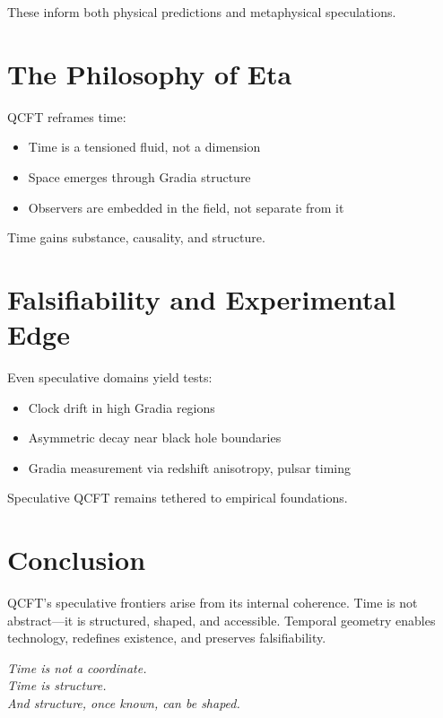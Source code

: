 \documentclass[12pt]{article}
\begin{document}
These inform both physical predictions and metaphysical speculations.

\section{The Philosophy of Eta}

QCFT reframes time:

\begin{itemize}
\item Time is a tensioned fluid, not a dimension
\item Space emerges through Gradia structure
\item Observers are embedded in the field, not separate from it
\end{itemize}

Time gains substance, causality, and structure.

\section{Falsifiability and Experimental Edge}

Even speculative domains yield tests:

\begin{itemize}
\item Clock drift in high Gradia regions
\item Asymmetric decay near black hole boundaries
\item Gradia measurement via redshift anisotropy, pulsar timing
\end{itemize}

Speculative QCFT remains tethered to empirical foundations.

\section*{Conclusion}

QCFT’s speculative frontiers arise from its internal coherence. Time is not abstract—it is structured, shaped, and accessible. Temporal geometry enables technology, redefines existence, and preserves falsifiability.

\begin{center}
\textit{Time is not a coordinate.\\Time is structure.\\And structure, once known, can be shaped.}
\end{center}
\end{document}
